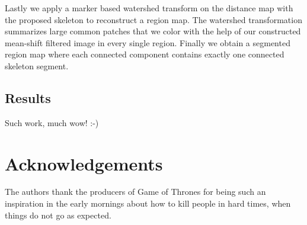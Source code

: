 \documentclass[10pt,conference,compsocconf]{IEEEtran}
\begin{document}
Lastly we apply a marker based watershed transform on the distance map with the proposed skeleton to reconstruct a region map. The watershed transformation summarizes large common patches that we color with the help of our constructed mean-shift filtered image in every single region. Finally we obtain a segmented region map where each connected component contains exactly one connected skeleton segment. 

\subsection{Results}

Such work, much wow! :-)

\section*{Acknowledgements}
The authors thank the producers of Game of Thrones for being such an inspiration in the early mornings about how to kill people in hard times, when things do not go as expected.



\end{document}
